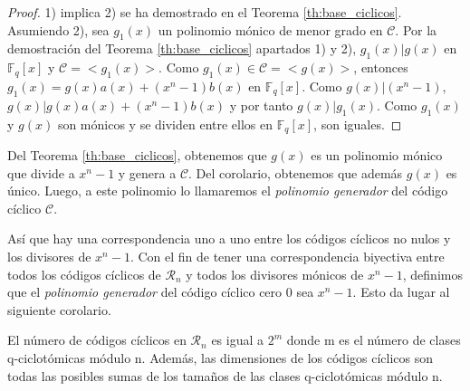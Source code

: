 \begin{proof}
1) implica 2) se ha demostrado en el Teorema \ref{th:base_ciclicos}. Asumiendo 2), sea $g_1(x)$ un polinomio mónico de menor grado en $\mathcal{C}$. Por la demostración del Teorema \ref{th:base_ciclicos} apartados 1) y 2), $g_1(x) | g(x)$ en $\mathbb{F}_q[x]$ y $\mathcal{C} = < g_1(x)>$. Como $ g_1(x) \in \mathcal{C} = < g(x) >$, entonces $g_1(x) = g(x)a(x) + (x^n-1)b(x)$ en $\mathbb{F}_q[x]$. Como $g(x) | (x^n-1)$, $g(x) | g(x)a(x) + (x^n-1)b(x)$ y por tanto $g(x) | g_1(x)$. Como $g_1(x)$ y $g(x)$ son mónicos  y se dividen entre ellos en $\mathbb{F}_q[x]$, son iguales.
\end{proof}

Del Teorema \ref{th:base_ciclicos}, obtenemos que $g(x)$ es un polinomio mónico que divide a $x^n-1$ y genera a $\mathcal{C}$. Del corolario, obtenemos que además $g(x)$ es único. Luego, a este polinomio lo llamaremos el \textit{polinomio generador} del código cíclico $\mathcal{C}$.

Así que hay una correspondencia uno a uno entre los códigos cíclicos no nulos y los divisores de $x^n-1$. Con el fin de tener una correspondencia biyectiva entre todos los códigos cíclicos de $\mathcal{R}_n$ y todos los divisores mónicos de $x^n-1$, definimos que el \textit{polinomio generador} del código cíclico cero ${0}$ sea $x^n-1$. Esto da lugar al siguiente corolario.

\begin{corollary}
El número de códigos cíclicos en $\mathcal{R}_n$ es igual a $2^m$ donde m es el número de clases q-ciclotómicas módulo n. Además, las dimensiones de los códigos cíclicos son todas las posibles sumas de los tamaños de las clases q-ciclotómicas módulo n.

\end{corollary}

